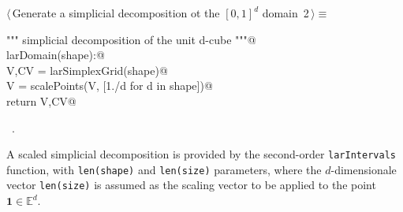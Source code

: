 \documentclass[11pt,oneside]{article}	%
\def\E{\mathbb{E}}
\begin{document}
\begin{flushleft} \small \label{scrap1}
\protect{}$\langle\,$Generate a simplicial decomposition ot the $[0,1]^d$ domain\nobreak\ {\footnotesize 2}$\,\rangle\equiv$
\vspace{-1ex}
\begin{list}{}{} \item
\mbox{}\verb@""" simplicial decomposition of the unit d-cube """@\\
\mbox{}\verb@def larDomain(shape):@\\
\mbox{}\verb@   V,CV = larSimplexGrid(shape)@\\
\mbox{}\verb@   V = scalePoints(V, [1./d for d in shape])@\\
\mbox{}\verb@   return V,CV@\\
\mbox{}\verb@@{\NWsep}
\end{list}
\vspace{-1ex}
\footnotesize\addtolength{\baselineskip}{-1ex}
\begin{list}{}{\setlength{\itemsep}{-\parsep}\setlength{\itemindent}{-\leftmargin}}
\item \NWtxtMacroRefIn\ .
\end{list}
\end{flushleft}

A scaled simplicial decomposition is provided by the second-order  \texttt{larIntervals} function, with \texttt{len(shape)} and \texttt{len(size)} parameters, where the $d$-dimensionale vector \texttt{len(size)} is assumed as the scaling vector to be applied to the point $\mathbf{1}\in\E^d$.
\end{document}
